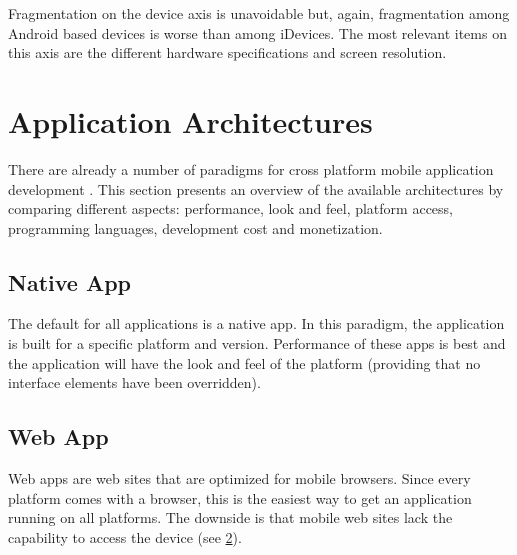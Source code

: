 \npar Fragmentation on the device axis is unavoidable but, again, fragmentation among Android based devices is worse than among iDevices. The most relevant items on this axis are the different hardware specifications and screen resolution.

\npar 

\section{Application Architectures}

\npar There are already a number of paradigms for cross platform mobile application development \citep{Friese}. This section presents an overview of the available architectures by comparing different aspects: performance, look and feel, platform access, programming languages, development cost and monetization.

\subsection{Native App}

\npar The default for all applications is a native app. In this paradigm, the application is built for a specific platform and version. Performance of these apps is best and the application will have the look and feel of the platform (providing that no interface elements have been overridden). 



\begin{figure}
    \begin{center}
        \label{fig:native}
        \caption{}
    \end{center}
\end{figure}

\subsection{Web App}

\npar Web apps are web sites that are optimized for mobile browsers. Since every platform comes with a browser, this is the easiest way to get an application running on all platforms. The downside is that mobile web sites lack the capability to access the device (see \ref{fig:web}).

\begin{figure}
    \begin{center}
        \label{fig:web}
        \caption{}
    \end{center}
\end{figure}

